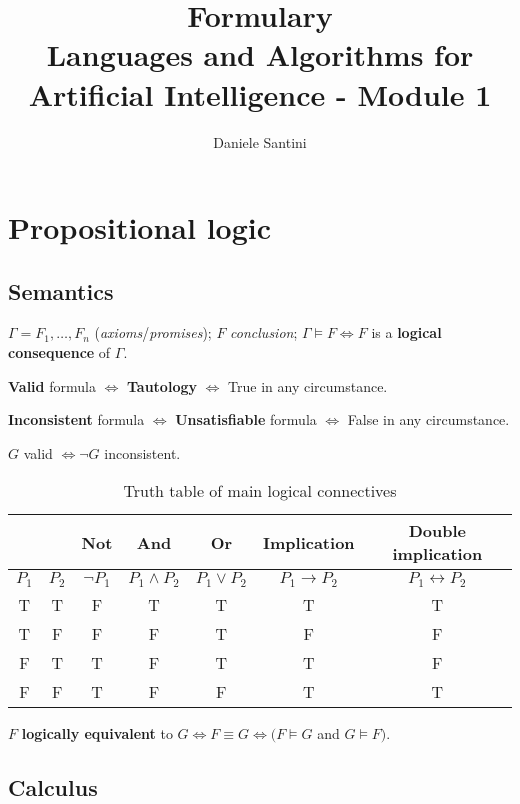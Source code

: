 \documentclass[]{article}
\title{Formulary \\ \large Languages and Algorithms for Artificial Intelligence - Module 1}
\author{Daniele Santini}
\begin{document}

\section{Propositional logic}

\subsection{Semantics}

\noindent $\Gamma = F_1,\dots,F_n$ (\textit{axioms}/\textit{promises});
$F$ \textit{conclusion}; 	
$\Gamma \models F \iff F$ is a \textbf{logical consequence} of $\Gamma$.

\noindent \textbf{Valid} formula $\iff$ \textbf{Tautology} $\iff$ True in any circumstance.

\noindent \textbf{Inconsistent} formula $\iff$ \textbf{Unsatisfiable} formula $\iff$ False in any circumstance.

\noindent $G$ valid $\iff \neg G$ inconsistent.

\begin{table}[h]
	\centering
	\caption{Truth table of main logical connectives}
	\begin{tabular}{ |c |c|c | c | c| c | c | } 
		\hline
		 &  & \textbf{Not} & \textbf{And} & \textbf{Or} & \textbf{Implication} & \textbf{Double implication} \\
		\hline
		$P_1$ & $P_2$ & $\neg P_1$ & $P_1 \land P_2$ & $P_1 \lor P_2$ & $P_1 \rightarrow P_2$ & $P_1 \leftrightarrow P_2$ \\
		\hline
		T & T & F & T & T & T & T \\
		\hline
		T & F & F & F & T & F & F \\
		\hline
		F & T & T & F & T & T & F \\
		\hline
		F & F & T & F & F & T & T \\
		\hline
	\end{tabular}
\end{table}

\noindent $F$ \textbf{logically equivalent} to $G \iff F \equiv G \iff (F \models G$ and $G \models F)$.

\subsection{Calculus}
\end{document}

